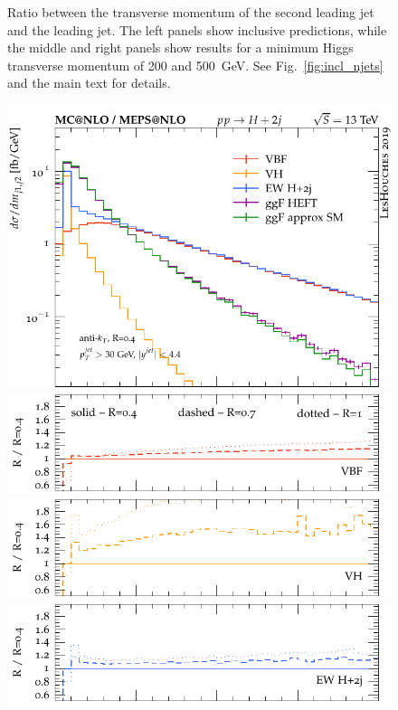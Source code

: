 \documentclass[10pt,prd,fleqn,superscriptaddress,notitlepage,nofootinbib,preprintnumbers,nobalancelastpage]{revtex4-1}
\begin{document}
\begin{figure}[p]
\begin{minipage}{.2925\textwidth}
  \end{minipage}\hfill
\caption{Ratio between the transverse momentum of the second leading jet and the leading jet. The left panels show inclusive predictions,
while the middle and right panels show results for a minimum Higgs transverse momentum of 200 and 500~GeV.
See Fig.~\ref{fig:incl_njets} and the main text for details.}
\label{fig:incl_pt2_pt1}
\end{figure}
\begin{figure}[p]
\centering
  \begin{minipage}{.2925\textwidth}
    \includegraphics[width=\textwidth]{figures/channels/m_jj12.pdf}
    \includegraphics[width=\textwidth]{figures/channels/m_jj12_rVBF.pdf}
    \includegraphics[width=\textwidth]{figures/channels/m_jj12_rVH.pdf}
    \includegraphics[width=\textwidth]{figures/channels/m_jj12_rHJJ.pdf}

\end{minipage}
\end{figure}
\end{document}
